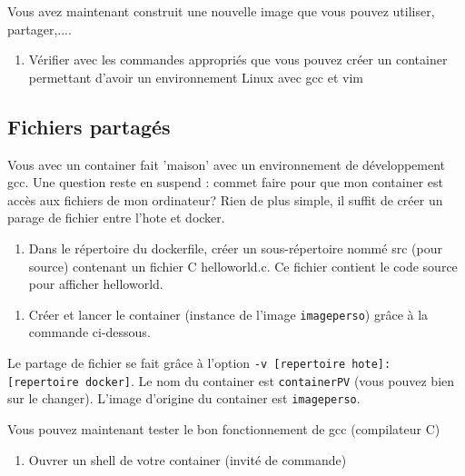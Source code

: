 \documentclass[french, 12pt]{article}%
\begin{document}
Vous avez maintenant construit une nouvelle image que vous pouvez utiliser, partager,....

\begin{enumerate}[resume]
\item Vérifier avec les commandes appropriés que vous pouvez créer un container permettant d'avoir un environnement Linux avec gcc et vim
\end{enumerate}


\subsection{Fichiers partagés}


Vous avec un container fait 'maison' avec un environnement de développement gcc. Une question reste en suspend : commet faire pour que mon container est accès aux fichiers de mon ordinateur? Rien de plus simple, il suffit de créer un parage de fichier entre l'hote et docker. 

\begin{enumerate}
\item Dans le répertoire du dockerfile, créer un sous-répertoire nommé src (pour source) contenant un fichier C helloworld.c. Ce fichier contient le code source pour afficher helloworld.
\end{enumerate}

\begin{enumerate}[resume]
\item Créer et lancer le container (instance de l'image \verb?imageperso?) grâce à la commande ci-dessous. 
\end{enumerate}




Le partage de fichier se fait grâce à l'option \verb?-v [repertoire hote]: [repertoire docker]?. Le nom du container est \verb?containerPV? (vous pouvez bien sur le changer). L'image d'origine du container est \verb?imageperso?.


Vous pouvez maintenant tester le bon fonctionnement de gcc (compilateur C)
\begin{enumerate}[resume]
\item Ouvrer un shell de votre container  (invité de commande)
\end{enumerate}
\end{document}
